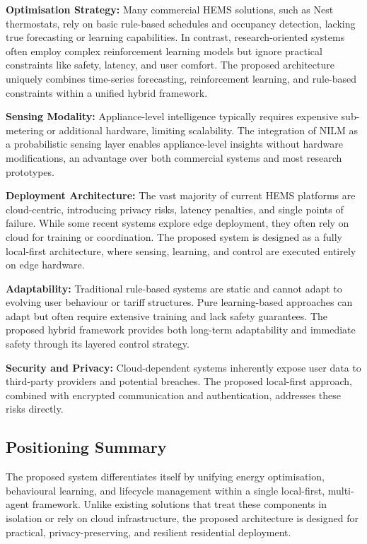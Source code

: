 \documentclass[11pt,a4paper]{article}
\begin{document}
\textbf{Optimisation Strategy:} Many commercial HEMS solutions, such as Nest thermostats, rely on basic rule-based schedules and occupancy detection, lacking true forecasting or learning capabilities. In contrast, research-oriented systems often employ complex reinforcement learning models but ignore practical constraints like safety, latency, and user comfort. The proposed architecture uniquely combines time-series forecasting, reinforcement learning, and rule-based constraints within a unified hybrid framework.

\textbf{Sensing Modality:} Appliance-level intelligence typically requires expensive sub-metering or additional hardware, limiting scalability. The integration of NILM as a probabilistic sensing layer enables appliance-level insights without hardware modifications, an advantage over both commercial systems and most research prototypes.

\textbf{Deployment Architecture:} The vast majority of current HEMS platforms are cloud-centric, introducing privacy risks, latency penalties, and single points of failure. While some recent systems explore edge deployment, they often rely on cloud for training or coordination. The proposed system is designed as a fully local-first architecture, where sensing, learning, and control are executed entirely on edge hardware.

\textbf{Adaptability:} Traditional rule-based systems are static and cannot adapt to evolving user behaviour or tariff structures. Pure learning-based approaches can adapt but often require extensive training and lack safety guarantees. The proposed hybrid framework provides both long-term adaptability and immediate safety through its layered control strategy.

\textbf{Security and Privacy:} Cloud-dependent systems inherently expose user data to third-party providers and potential breaches. The proposed local-first approach, combined with encrypted communication and authentication, addresses these risks directly.

\subsection{Positioning Summary}

The proposed system differentiates itself by unifying energy optimisation, behavioural learning, and lifecycle management within a single local-first, multi-agent framework. Unlike existing solutions that treat these components in isolation or rely on cloud infrastructure, the proposed architecture is designed for practical, privacy-preserving, and resilient residential deployment.
\end{document}
